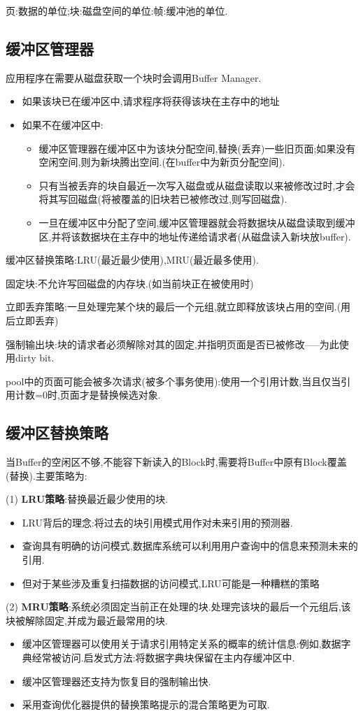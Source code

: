 页:数据的单位;块:磁盘空间的单位:帧:缓冲池的单位.

\subsection{缓冲区管理器}

应用程序在需要从磁盘获取一个块时会调用Buffer Manager.

\begin{itemize}
    \item 如果该块已在缓冲区中,请求程序将获得该块在主存中的地址
    \item 如果不在缓冲区中:
      \begin{itemize}
         \item 缓冲区管理器在缓冲区中为该块分配空间,替换(丢弃)一些旧页面;如果没有空闲空间,则为新块腾出空间.(在buffer中为新页分配空间).
         \item 只有当被丢弃的块自最近一次写入磁盘或从磁盘读取以来被修改过时,才会将其写回磁盘(将被覆盖的旧块若已被修改过,则写回磁盘).
         \item 一旦在缓冲区中分配了空间,缓冲区管理器就会将数据块从磁盘读取到缓冲区,并将该数据块在主存中的地址传递给请求者(从磁盘读入新块放buffer).
      \end{itemize}
\end{itemize}

缓冲区替换策略:LRU(最近最少使用),MRU(最近最多使用).

固定块:不允许写回磁盘的内存块.(如当前块正在被使用时)

立即丢弃策略:一旦处理完某个块的最后一个元组,就立即释放该块占用的空间.(用后立即丢弃)

强制输出块:块的请求者必须解除对其的固定,并指明页面是否已被修改-----为此使用dirty bit.

pool中的页面可能会被多次请求(被多个事务使用):使用一个引用计数,当且仅当引用计数=0时,页面才是替换候选对象.

\subsection{缓冲区替换策略}

当Buffer的空闲区不够,不能容下新读入的Block时,需要将Buffer中原有Block覆盖(替换).主要策略为:

(1) \textbf{LRU策略}:替换最近最少使用的块.

\begin{itemize}
    \item LRU背后的理念:将过去的块引用模式用作对未来引用的预测器.
    \item 查询具有明确的访问模式,数据库系统可以利用用户查询中的信息来预测未来的引用.
    \item 但对于某些涉及重复扫描数据的访问模式,LRU可能是一种糟糕的策略
\end{itemize}

(2) \textbf{MRU策略}:系统必须固定当前正在处理的块.处理完该块的最后一个元组后,该块被解除固定,并成为最近最常用的块.

\begin{itemize}
    \item 缓冲区管理器可以使用关于请求引用特定关系的概率的统计信息:例如,数据字典经常被访问.启发式方法:将数据字典块保留在主内存缓冲区中.
    \item 缓冲区管理器还支持为恢复目的强制输出快.
    \item 采用查询优化器提供的替换策略提示的混合策略更为可取.
\end{itemize}